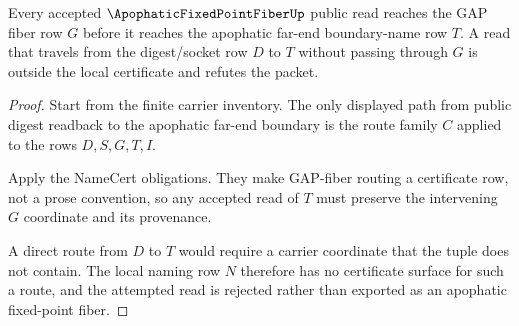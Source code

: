 \begin{theorem}
\label{thm:apophatic-fixed-point-fiber-nonescape}
Every accepted $\ApophaticFixedPointFiberUp$ public read reaches the GAP fiber row $G$ before it reaches the apophatic far-end boundary-name row $T$. A read that travels from the digest/socket row $D$ to $T$ without passing through $G$ is outside the local certificate and refutes the packet.
\end{theorem}
\begin{proof}
Start from the finite carrier inventory. The only displayed path from public digest readback to the apophatic far-end boundary is the route family $C$ applied to the rows $D,S,G,T,I$.

Apply the NameCert obligations. They make GAP-fiber routing a certificate row, not a prose convention, so any accepted read of $T$ must preserve the intervening $G$ coordinate and its provenance.

A direct route from $D$ to $T$ would require a carrier coordinate that the tuple does not contain. The local naming row $N$ therefore has no certificate surface for such a route, and the attempted read is rejected rather than exported as an apophatic fixed-point fiber.
\end{proof}

